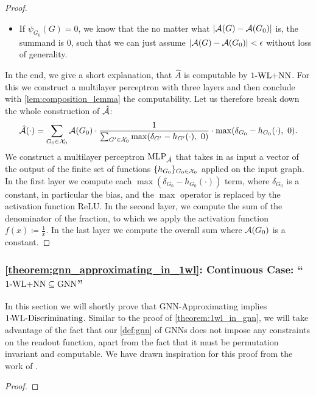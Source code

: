 \begin{proof}
\begin{itemize}
        \item If $\psi_{G_0}(G) = 0$, we know that the no matter what $|\mathcal{A}(G) - \mathcal{A}(G_0)|$ is, the summand is $0$, such that we can just assume $|\mathcal{A}(G) - \mathcal{A}(G_0)| < \epsilon$ without loss of generality.
    \end{itemize}
    In the end, we give a short explanation, that $\hat{A}$ is computable by $\text{1-WL+NN}$. For this we construct a multilayer perceptron with three layers and then conclude with \autoref{lem:composition_lemma} the computability. Let us therefore break down the whole construction of $\hat{\mathcal{A}}$:
    \begin{eqnarray*}
        \hat{\mathcal{A}}(\cdot) = \sum_{G_0 \in \mathcal{X}_0} \mathcal{A}(G_0) \cdot \frac{1}{\sum_{G' \in \mathcal{X}_0} \max(\delta_{G'} -  h_{G'}(\cdot), \ 0)} \cdot \max(\delta_{G_0} -  h_{G_0}(\cdot), \ 0).
    \end{eqnarray*}
    We construct a multilayer perceptron $\text{MLP}_{\hat{\mathcal{A}}}$ that takes in as input a vector of the output of the finite set of functions $\{ h_{G_0} \}_{G_0 \in \mathcal{X}_0}$ applied on the input graph. In the first layer we compute each $\max(\delta_{G_0} -  h_{G_0}(\cdot))$ term, where $\delta_{G_0}$ is a constant, in particular the bias, and the $\max$ operator is replaced by the activation function ReLU. In the second layer, we compute the sum of the denominator of the fraction, to which we apply the activation function $f(x) \coloneqq \frac{1}{x}$. In the last layer we compute the overall sum where $\mathcal{A}(G_0)$ is a constant.
\end{proof}

\subsubsection{\autoref{theorem:gnn_approximating_in_1wl}: Continuous Case: ``$\text{1-WL+NN} \subseteq \text{GNN}$''}\label{app:wlnn_in_gnn}
In this section we will shortly prove that GNN-Approximating implies $\text{1-\!WL-Discriminating}$. Similar to the proof of \autoref{theorem:1wl_in_gnn}, we will take advantage of the fact that our \autoref{def:gnn} of GNNs does not impose any constraints on the readout function, apart from the fact that it must be permutation invariant and computable. We have drawn inspiration for this proof from the work of \cite{Chen2019}.

\begin{proof}
    
\end{proof}

